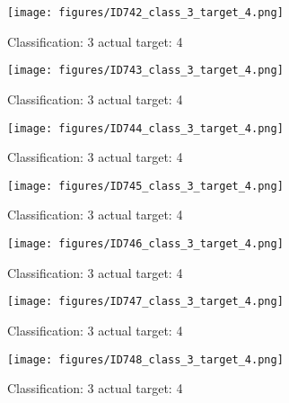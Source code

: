 \begin{figure}[h!]
\begin{center}
\texttt{[image: figures/ID742\_class\_3\_target\_4.png]}
\end{center}
\caption{ Classification: 3 actual target: 4}
\label{fig:ID742_class_3_target_4}
\end{figure}
\begin{figure}[h!]
\begin{center}
\texttt{[image: figures/ID743\_class\_3\_target\_4.png]}
\end{center}
\caption{ Classification: 3 actual target: 4}
\label{fig:ID743_class_3_target_4}
\end{figure}
\begin{figure}[h!]
\begin{center}
\texttt{[image: figures/ID744\_class\_3\_target\_4.png]}
\end{center}
\caption{ Classification: 3 actual target: 4}
\label{fig:ID744_class_3_target_4}
\end{figure}
\begin{figure}[h!]
\begin{center}
\texttt{[image: figures/ID745\_class\_3\_target\_4.png]}
\end{center}
\caption{ Classification: 3 actual target: 4}
\label{fig:ID745_class_3_target_4}
\end{figure}
\begin{figure}[h!]
\begin{center}
\texttt{[image: figures/ID746\_class\_3\_target\_4.png]}
\end{center}
\caption{ Classification: 3 actual target: 4}
\label{fig:ID746_class_3_target_4}
\end{figure}
\begin{figure}[h!]
\begin{center}
\texttt{[image: figures/ID747\_class\_3\_target\_4.png]}
\end{center}
\caption{ Classification: 3 actual target: 4}
\label{fig:ID747_class_3_target_4}
\end{figure}
\begin{figure}[h!]
\begin{center}
\texttt{[image: figures/ID748\_class\_3\_target\_4.png]}
\end{center}
\caption{ Classification: 3 actual target: 4}
\label{fig:ID748_class_3_target_4}
\end{figure}
